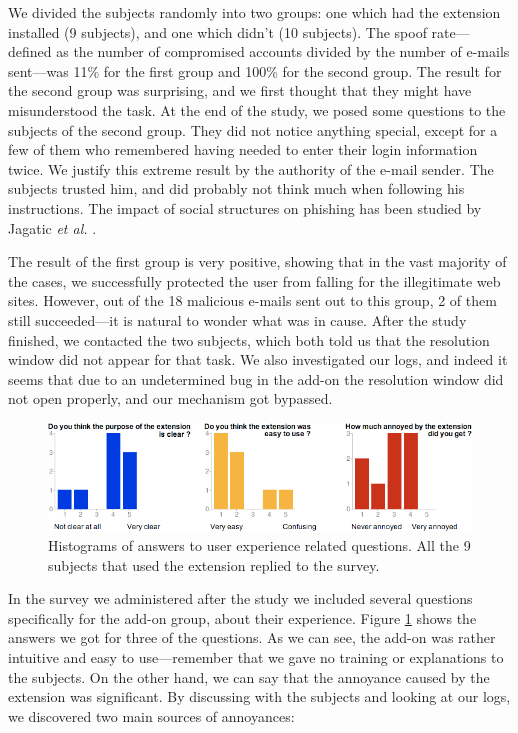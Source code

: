 \documentclass[11pt,styles/chicago,a4paper]{article}
\begin{document}
We divided the subjects randomly into two groups: one which had the extension installed (9 subjects), and one which didn't (10 subjects). The spoof rate---defined as the number of compromised accounts divided by the number of e-mails sent---was 11\% for the first group and 100\% for the second group. The result for the second group was surprising, and we first thought that they might have misunderstood the task. At the end of the study, we posed some questions to the subjects of the second group. They did not notice anything special, except for a few of them who remembered having needed to enter their login information twice. We justify this extreme result by the authority of the e-mail sender. The subjects trusted him, and did probably not think much when following his instructions. The impact of social structures on phishing has been studied by Jagatic \emph{et al.} \cite{jagatic2007social}.

The result of the first group is very positive, showing that in the vast majority of the cases, we successfully protected the user from falling for the illegitimate web sites. However, out of the 18 malicious e-mails sent out to this group, 2 of them still succeeded---it is natural to wonder what was in cause. After the study finished, we contacted the two subjects, which both told us that the resolution window did not appear for that task. We also investigated our logs, and indeed it seems that due to an undetermined bug in the add-on the resolution window did not open properly, and our mechanism got bypassed.

\begin{figure}[t]
  \includegraphics[width=\textwidth]{figures/experience.png}
  \caption{Histograms of answers to user experience related questions. All the 9 subjects that used the extension replied to the survey.}
  \label{fig:experiences}
\end{figure}

In the survey we administered after the study we included several questions specifically for the add-on group, about their experience. Figure \ref{fig:experiences} shows the answers we got for three of the questions. As we can see, the add-on was rather intuitive and easy to use---remember that we gave no training or explanations to the subjects. On the other hand, we can say that the annoyance caused by the extension was significant. By discussing with the subjects and looking at our logs, we discovered two main sources of annoyances:
\end{document}
